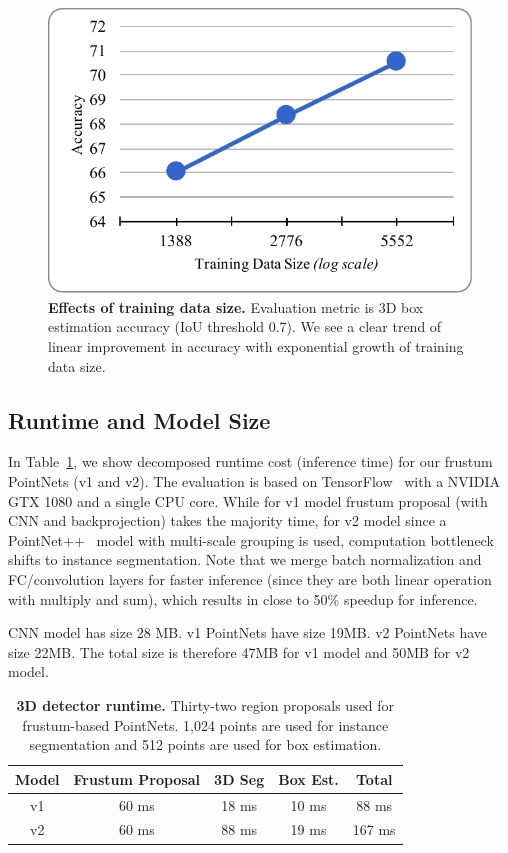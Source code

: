 \begin{figure}[h!]
    \centering
    \includegraphics[width=0.6\linewidth]{./fig/training_data_amount.pdf}
    \caption{\textbf{Effects of training data size.} Evaluation metric is 3D box estimation accuracy (IoU threshold 0.7). We see a clear trend of linear improvement in accuracy with exponential growth of training data size.}
    \label{fig:training_data_size}
\end{figure}

\subsection{Runtime and Model Size}
\label{sec:runtime}
In Table~\ref{tab:runtime}, we show decomposed runtime cost (inference time) for our frustum PointNets (v1 and v2). The evaluation is based on TensorFlow~\cite{abadi2016tensorflow} with a NVIDIA GTX 1080 and a single CPU core. While for v1 model frustum proposal (with CNN and backprojection) takes the majority time, for v2 model since a PointNet++~\cite{qi2017pointnetplusplus} model with multi-scale grouping is used, computation bottleneck shifts to instance segmentation. Note that we merge batch normalization and FC/convolution layers for faster inference (since they are both linear operation with multiply and sum), which results in close to 50\% speedup for inference.

CNN model has size 28 MB. v1 PointNets have size 19MB. v2 PointNets have size 22MB. The total size is therefore 47MB for v1 model and 50MB for v2 model.

\begin{table}[h!]
\small
\centering
\begin{tabular}{c|ccc|c}
\hline
Model & Frustum Proposal & 3D Seg &  Box Est. & Total \\ \hline
v1 & 60 ms & 18 ms & 10 ms & 88 ms \\ 
v2 & 60 ms & 88 ms & 19 ms & 167 ms \\ \hline
\end{tabular}
\caption{\textbf{3D detector runtime.} Thirty-two region proposals used for frustum-based PointNets. 1,024 points are used for instance segmentation and 512 points are used for box estimation.}
\label{tab:runtime}
\end{table}

